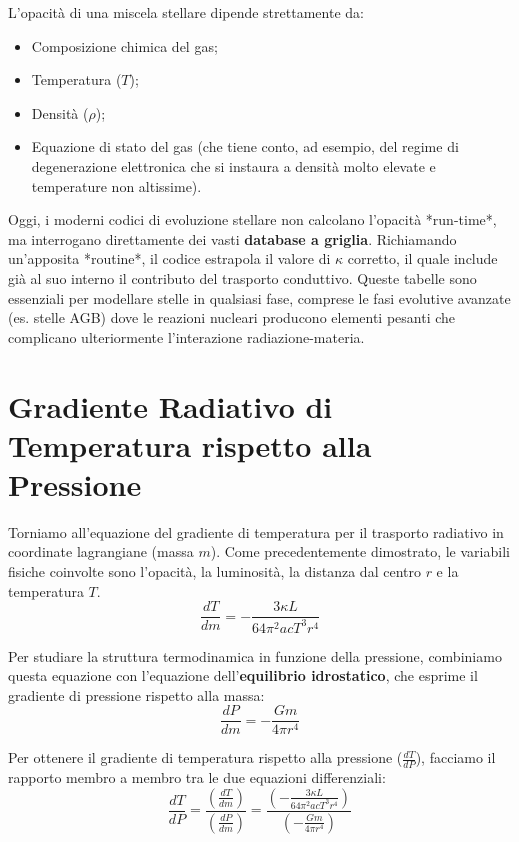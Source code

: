 L'opacità di una miscela stellare dipende strettamente da:
\begin{itemize}
\item Composizione chimica del gas;
\item Temperatura ($T$);
\item Densità ($\rho$);
\item Equazione di stato del gas (che tiene conto, ad esempio, del regime di degenerazione elettronica che si instaura a densità molto elevate e temperature non altissime).
\end{itemize}

Oggi, i moderni codici di evoluzione stellare non calcolano l'opacità *run-time*, ma interrogano direttamente dei vasti \textbf{database a griglia}. Richiamando un'apposita *routine*, il codice estrapola il valore di $\kappa$ corretto, il quale include già al suo interno il contributo del trasporto conduttivo. Queste tabelle sono essenziali per modellare stelle in qualsiasi fase, comprese le fasi evolutive avanzate (es. stelle AGB) dove le reazioni nucleari producono elementi pesanti che complicano ulteriormente l'interazione radiazione-materia.

\section{Gradiente Radiativo di Temperatura rispetto alla Pressione}

Torniamo all'equazione del gradiente di temperatura per il trasporto radiativo in coordinate lagrangiane (massa $m$). Come precedentemente dimostrato, le variabili fisiche coinvolte sono l'opacità, la luminosità, la distanza dal centro $r$ e la temperatura $T$.
\begin{equation}
\frac{dT}{dm} = - \frac{3 \kappa L}{64 \pi^2 a c T^3 r^4}
\end{equation}

Per studiare la struttura termodinamica in funzione della pressione, combiniamo questa equazione con l'equazione dell'\textbf{equilibrio idrostatico}, che esprime il gradiente di pressione rispetto alla massa:
\begin{equation}
\frac{dP}{dm} = - \frac{G m}{4 \pi r^4}
\end{equation}

Per ottenere il gradiente di temperatura rispetto alla pressione ($\frac{dT}{dP}$), facciamo il rapporto membro a membro tra le due equazioni differenziali:
\begin{equation}
\frac{dT}{dP} = \frac{\left( \frac{dT}{dm} \right)}{\left( \frac{dP}{dm} \right)} = \frac{\left( - \frac{3 \kappa L}{64 \pi^2 a c T^3 r^4} \right)}{\left( - \frac{G m}{4 \pi r^4} \right)}
\end{equation}

